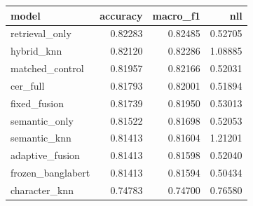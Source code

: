 \begin{tabular}{lrrr}
\toprule
model & accuracy & macro_f1 & nll \\
\midrule
retrieval_only & 0.82283 & 0.82485 & 0.52705 \\
hybrid_knn & 0.82120 & 0.82286 & 1.08885 \\
matched_control & 0.81957 & 0.82166 & 0.52031 \\
cer_full & 0.81793 & 0.82001 & 0.51894 \\
fixed_fusion & 0.81739 & 0.81950 & 0.53013 \\
semantic_only & 0.81522 & 0.81698 & 0.52053 \\
semantic_knn & 0.81413 & 0.81604 & 1.21201 \\
adaptive_fusion & 0.81413 & 0.81598 & 0.52040 \\
frozen_banglabert & 0.81413 & 0.81594 & 0.50434 \\
character_knn & 0.74783 & 0.74700 & 0.76580 \\
\bottomrule
\end{tabular}
